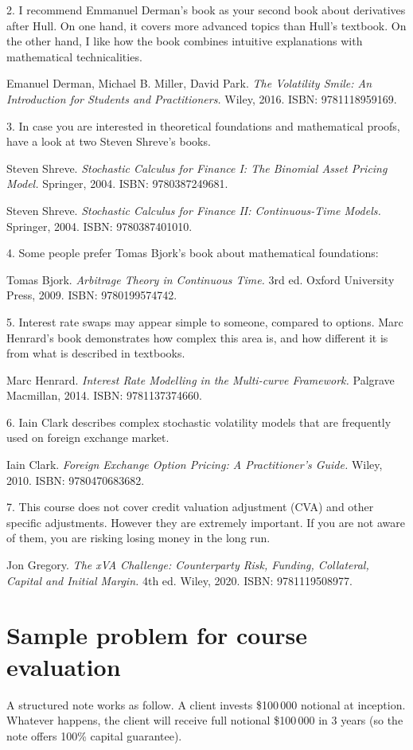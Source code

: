 \documentclass[a4paper,14pt]{extarticle}
\begin{document}
2. I recommend Emmanuel Derman’s book as your second book about derivatives after Hull. On
one hand, it covers more advanced topics than Hull’s textbook. On the other hand, I like how the
book combines intuitive explanations with mathematical technicalities.

Emanuel Derman, Michael B. Miller, David Park. \textit{The Volatility Smile: An Introduction for Students
and Practitioners.} Wiley, 2016. ISBN: 9781118959169.

3. In case you are interested in theoretical foundations and mathematical proofs, have a look at
two Steven Shreve’s books.

Steven Shreve. \textit{Stochastic Calculus for Finance I: The Binomial Asset Pricing Model.} Springer, 2004.
ISBN: 9780387249681.

Steven Shreve. \textit{Stochastic Calculus for Finance II: Continuous-Time Models.} Springer, 2004. ISBN:
9780387401010.

4. Some people prefer Tomas Bjork’s book about mathematical foundations:

Tomas Bjork. \textit{Arbitrage Theory in Continuous Time.} 3rd ed. Oxford University Press, 2009. ISBN:
9780199574742.

5. Interest rate swaps may appear simple to someone, compared to options. Marc Henrard’s
book demonstrates how complex this area is, and how different it is from what is described in
textbooks.

Marc Henrard. \textit{Interest Rate Modelling in the Multi-curve Framework.} Palgrave Macmillan, 2014.
ISBN: 9781137374660.

6. Iain Clark describes complex stochastic volatility models that are frequently used on foreign
exchange market.

Iain Clark. \textit{Foreign Exchange Option Pricing: A Practitioner's Guide.} Wiley, 2010. ISBN: 9780470683682.

7. This course does not cover credit valuation adjustment (CVA) and other specific adjustments.
However they are extremely important. If you are not aware of them, you are risking losing
money in the long run.

Jon Gregory. \textit{The xVA Challenge: Counterparty Risk, Funding, Collateral, Capital and Initial Margin.}
4th ed. Wiley, 2020. ISBN: 9781119508977.

\section*{Sample problem for course evaluation}
A structured note works as follow. A client invests \$100\,000 notional at inception. Whatever
happens, the client will receive full notional \$100\,000 in 3 years (so the note offers 100\% capital
guarantee).
\end{document}
